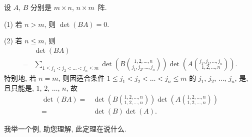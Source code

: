 \documentclass[%
    UTF8,%
    fontset=none,%
    punct=kaiming,%
    zihao=-4,%
    a4paper,%
    oneside,%
]{ctexbook}
\renewcommand*{\leq}{\leqslant}
\begin{document}
\begin{theorem}
    设 \(A\), \(B\) 分别是 \(m \times n\), \(n \times m\)~阵.

    (1)
    若 \(n > m\), 则 \(\det {(BA)} = 0\).

    (2)
    若 \(n \leq m\),
    则
    \begin{align*}
             & \det {(BA)}
        \\
        = {} & \sum_{1 \leq j_1 < j_2 < \dots < j_n \leq m}
        {
            \det {\left(
                B\binom{1, 2, \dots, n}{j_1, j_2, \dots, j_n}
                \right)}
            \det {\left(
                A\binom{j_1, j_2, \dots, j_n}{1, 2, \dots, n}
                \right)}
        }.
    \end{align*}
    特别地, 若 \(n = m\), 则因适合条件
    \(1 \leq j_1 < j_2 < \dots < j_n \leq m\)
    的 \(j_1\), \(j_2\), \(\dots\), \(j_n\),
    是, 且只能是,
    \(1\), \(2\), \(\dots\), \(n\),
    故
    \begin{align*}
        \det {(BA)}
        = {} &
        \det {\left(
            B\binom{1, 2, \dots, n}{1, 2, \dots, n}
            \right)}
        \det {\left(
            A\binom{1, 2, \dots, n}{1, 2, \dots, n}
            \right)}
        \\
        = {} & \det {(B)} \det {(A)}.
    \end{align*}
\end{theorem}

我举一个例, 助您理解, 此定理在说什么.
\end{document}
